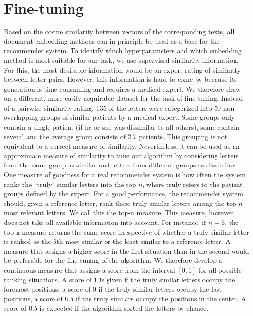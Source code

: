 \section{Fine-tuning}
Based on the cosine similarity between vectors of the corresponding texts, all document embedding methods can in principle be used as a base for the recommender system. To identify which hyperparameters and which embedding method is most suitable for our task, we use supervised similarity information. For this, the most desirable information would be an expert rating of similarity between letter pairs. However, this information is hard to come by because its generation is time-consuming and requires a medical expert. We therefore draw on a different, more easily acquirable dataset for the task of fine-tuning. Instead of a pairwise similarity rating, 135 of the letters were categorized into 50 non-overlapping groups of similar patients by a medical expert.
Some groups only contain a single patient (if he or she was dissimilar to all others), some contain several and the average group consists of 2.7 patients. This grouping is not equivalent to a correct measure of similarity. Nevertheless, it can be used as an approximate measure of similarity to tune our algorithm by considering letters from the same group as similar and letters from different groups as dissimilar. One measure of goodness for a real recommender system is how often the system ranks the ``truly'' similar letters into the top $n$, where truly refers to the patient groups defined by the expert. For a good performance, the recommender system should, given a reference letter, rank these truly similar letters among the top $n$ most relevant letters.  We call this the top-n measure. This measure, however, does not take all available information into account. For instance, if $n=5$, the top-n measure returns the same score irrespective of whether a truly similar letter is ranked as the 6th most similar or the least similar to a reference letter. 
A measure that assigns a higher score in the first situation than in the second would be preferable for the fine-tuning of the algorithm. We therefore develop a continuous measure that assigns a score from the interval $[0,1]$ for all possible ranking situations. A score of 1 is given if the truly similar letters occupy the foremost positions, a score of 0 if the truly similar letters occupy the last positions, a score of 0.5 if the truly similars occupy the positions in the center. A score of 0.5 is expected if the algorithm sorted the letters by chance.

